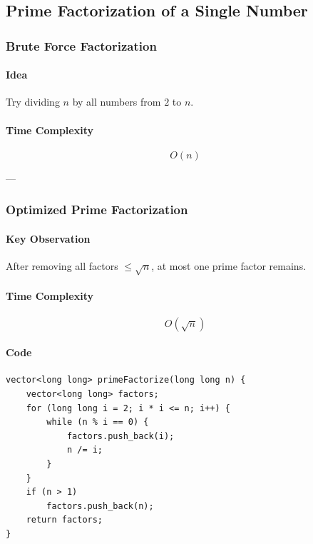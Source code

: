 \documentclass[11pt]{article}
\begin{document}
\subsection{Prime Factorization of a Single Number}

\subsubsection{Brute Force Factorization}

\paragraph{Idea}
Try dividing $n$ by all numbers from $2$ to $n$.

\paragraph{Time Complexity}
\[
O(n)
\]

---

\subsubsection{Optimized Prime Factorization}

\paragraph{Key Observation}
After removing all factors $\le \sqrt{n}$, at most one prime factor remains.

\paragraph{Time Complexity}
\[
O(\sqrt{n})
\]

\paragraph{Code}
\begin{lstlisting}
vector<long long> primeFactorize(long long n) {
    vector<long long> factors;
    for (long long i = 2; i * i <= n; i++) {
        while (n % i == 0) {
            factors.push_back(i);
            n /= i;
        }
    }
    if (n > 1)
        factors.push_back(n);
    return factors;
}
\end{lstlisting}

\end{document}
